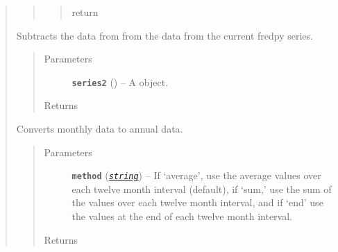 \documentclass[letterpaper,10pt,english]{sphinxmanual}
\begin{document}
\begin{fulllineitems}
\begin{quote}
\begin{fulllineitems}
\begin{quote}
\begin{quote}
\begin{description}
\item[{return}] \leavevmode
{\hyperref[series_class:fredpy.series]{}}

\end{description}\end{quote}
\end{quote}

\begin{fulllineitems}
\label{series_class:fredpy.series.minus}
Subtracts the data from  from the data from the current fredpy series.
\begin{quote}\begin{description}
\item[{Parameters}] \leavevmode
\textbf{\texttt{series2}} ({\hyperref[series_class:fredpy.series]{}}) -- A  object.

\item[{Returns}] \leavevmode
{\hyperref[series_class:fredpy.series]{}}

\end{description}\end{quote}

\end{fulllineitems}


\end{fulllineitems}


\begin{fulllineitems}
\label{series_class:fredpy.series.monthtoannual}
Converts monthly data to annual data.
\begin{quote}\begin{description}
\item[{Parameters}] \leavevmode
\textbf{\texttt{method}} (\href{https://docs.python.org/2/library/string.html\#module-string}{\emph{\texttt{string}}}) -- If `average', use the average values over each twelve month interval (default), if `sum,' use the sum of the values over each twelve month interval, and if `end' use the values at the end of each twelve month interval.

\item[{Returns}] \leavevmode
{\hyperref[series_class:fredpy.series]{}}


\end{description}
\end{quote}
\end{fulllineitems}
\end{quote}
\end{fulllineitems}
\end{document}
